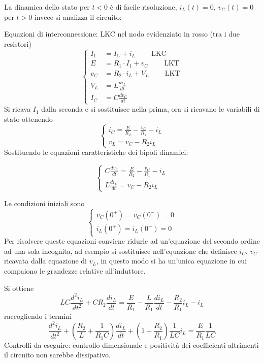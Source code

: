 La dinamica dello stato per $t<0$ è di facile risoluzione, $i_L(t) = 0$, $v_C(t) = 0$
per $t > 0$ invece si analizza il circuito:

Equazioni di interconnessione: 
LKC nel nodo evidenziato in rosso (tra i due resistori)
\begin{equation*}
\begin{cases}
I_1 &= I_C+i_L \ \qquad \text{LKC}\\
E &= R_1\cdot I_1 + v_C\ \qquad \text{LKT} \\
v_C &= R_2 \cdot i_L + V_L\ \qquad \text{LKT} \\
V_L &= L\frac{di_L}{dt} \\
I_C &= C\frac{dv_C}{dt}
\end{cases}
\end{equation*}
Si ricava $I_1$ dalla seconda e si sostituisce nella prima,
ora si ricavano le variabili di stato ottenendo
$$
\begin{cases}
i_C = \frac{E}{R_2} - \frac{v_C}{R_1} - i_L \\
v_L = v_C - R_2 i_L
\end{cases}
$$
Sostituendo le equazioni caratteristiche dei bipoli dinamici:

$$
\begin{cases}
C\frac{dv_C}{dt} = \frac{E}{R_2} - \frac{v_C}{R_1} - i_L \\
L\frac{di_L}{dt} = v_C - R_2 i_L
\end{cases}
$$

Le condizioni iniziali sono 
$$\begin{cases}
v_C(0^+) = v_C(0^-) = 0\\
i_L(0^+) = i_L(0^-) = 0
\end{cases}
$$
Per risolvere queste equazioni conviene ridurle ad un'equazione del secondo ordine ad una sola incognita,
ad esempio si sostituisce nell'equazione che definisce $i_C$, $v_C$ ricavata dalla equazione di
$v_L$, in questo modo si ha un'unica equazione in cui compaiono le grandezze relative all'induttore.

Si ottiene 
\begin{equation}
LC \frac{d^2i_L}{dt^2} + CR_2\frac{di_L}{dt} = \frac{E}{R_1} - \frac{L}{R_1}\frac{di_L}{dt} - \frac{R_2}{R_1}i_L-i_L
\end{equation}
raccogliendo i termini
$$
\frac{d^2i_L}{dt^2} + \left(\frac{R_2}{L} + \frac{1}{R_1C}\right)\frac{di_L}{dt}+ \left(1 + \frac{R_2}{R_1}\right)\frac{1}{LC} i_L = \frac{E}{R_1}\frac{1}{LC}
$$
Controlli da eseguire: controllo dimensionale e positività dei coefficienti altrimenti il circuito non sarebbe dissipativo.

